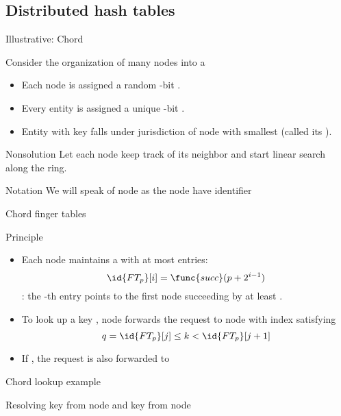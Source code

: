 \subsection{Distributed hash tables}
\begin{slide}{Illustrative: Chord}
  \begin{block}{Consider the organization of many nodes into a }
    \begin{itemize}\tightlist
    \item Each node is assigned a random -bit .
    \item Every entity is assigned a unique -bit .
    \item Entity with key  falls under jurisdiction of node with smallest 
      (called its  ).
    \end{itemize}
  \end{block}
  \begin{alertblock}{Nonsolution}
    Let each node keep track of its neighbor and start linear search along the ring.
  \end{alertblock}
  \begin{block}{Notation}
    We will speak of node  as the node have identifier 
  \end{block}
\end{slide}
\begin{slide}{Chord finger tables}
  \begin{block}{Principle}
    \begin{itemize}
    \item Each node  maintains a   with at most 
      entries:
      \[
      \id{FT_p}[i] = \func{succ}(p + 2^{i-1})
      \]
      : the -th entry points to the first node succeeding  by at least
      .
    \item To look up a key , node  forwards the request to node with index 
      satisfying
      \[
      q = \id{FT_p}[j] \leq k < \id{FT_p}[j+1]
      \]
    \item If , the request is also forwarded to 
    \end{itemize}
  \end{block}
\end{slide}
\begin{slide}{Chord lookup example}
  \begin{block}{Resolving key  from node  and key  from node }
    \begin{center}
    \end{center}
  \end{block}
\end{slide}
